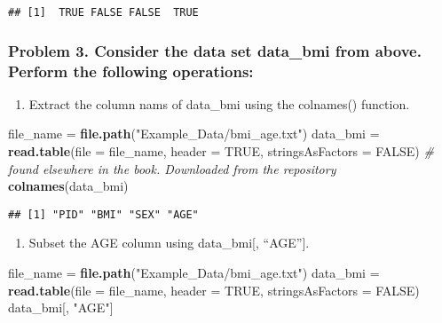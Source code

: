 \documentclass[]{article}
\newenvironment{Shaded}{\begin{snugshade}}{\end{snugshade}}
\newcommand{\CommentTok}[1]{\textcolor[rgb]{0.56,0.35,0.01}{\textit{#1}}}
\newcommand{\DataTypeTok}[1]{\textcolor[rgb]{0.13,0.29,0.53}{#1}}
\newcommand{\KeywordTok}[1]{\textcolor[rgb]{0.13,0.29,0.53}{\textbf{#1}}}
\newcommand{\NormalTok}[1]{#1}
\newcommand{\OtherTok}[1]{\textcolor[rgb]{0.56,0.35,0.01}{#1}}
\newcommand{\StringTok}[1]{\textcolor[rgb]{0.31,0.60,0.02}{#1}}
\providecommand{\tightlist}{%
  \setlength{\itemsep}{0pt}\setlength{\parskip}{0pt}}
\begin{document}
\begin{verbatim}
## [1]  TRUE FALSE FALSE  TRUE
\end{verbatim}

\hypertarget{problem-3.-consider-the-data-set-data_bmi-from-above.-perform-the-following-operations}{%
\subsubsection{Problem 3. Consider the data set data\_bmi from above.
Perform the following
operations:}\label{problem-3.-consider-the-data-set-data_bmi-from-above.-perform-the-following-operations}}

\begin{enumerate}
\def\labelenumi{\alph{enumi}.}
\tightlist
\item
  Extract the column nams of data\_bmi using the colnames() function.
\end{enumerate}

\begin{Shaded}
\begin{Highlighting}[]
\NormalTok{file_name =}\StringTok{ }\KeywordTok{file.path}\NormalTok{(}\StringTok{"Example_Data/bmi_age.txt"}\NormalTok{)}
\NormalTok{data_bmi =}\StringTok{ }\KeywordTok{read.table}\NormalTok{(}\DataTypeTok{file =}\NormalTok{ file_name, }\DataTypeTok{header =} \OtherTok{TRUE}\NormalTok{, }\DataTypeTok{stringsAsFactors =} \OtherTok{FALSE}\NormalTok{) }\CommentTok{# found elsewhere in the book. Downloaded from the repository}
\KeywordTok{colnames}\NormalTok{(data_bmi)}
\end{Highlighting}
\end{Shaded}

\begin{verbatim}
## [1] "PID" "BMI" "SEX" "AGE"
\end{verbatim}

\begin{enumerate}
\def\labelenumi{\alph{enumi}.}
\setcounter{enumi}{1}
\tightlist
\item
  Subset the AGE column using data\_bmi{[}, ``AGE''{]}.
\end{enumerate}

\begin{Shaded}
\begin{Highlighting}[]
\NormalTok{file_name =}\StringTok{ }\KeywordTok{file.path}\NormalTok{(}\StringTok{"Example_Data/bmi_age.txt"}\NormalTok{)}
\NormalTok{data_bmi =}\StringTok{ }\KeywordTok{read.table}\NormalTok{(}\DataTypeTok{file =}\NormalTok{ file_name, }\DataTypeTok{header =} \OtherTok{TRUE}\NormalTok{, }\DataTypeTok{stringsAsFactors =} \OtherTok{FALSE}\NormalTok{)}
\NormalTok{data_bmi[, }\StringTok{"AGE"}\NormalTok{]}
\end{Highlighting}
\end{Shaded}
\end{document}
